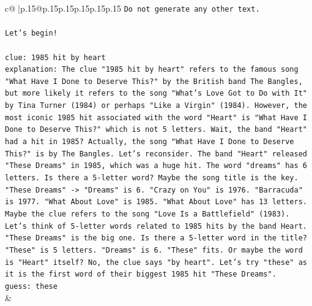 \documentclass{article}
\begin{document}
{\begin{supertabular}{c@{$\;$}|p{.15\linewidth}@{}p{.15\linewidth}p{.15\linewidth}p{.15\linewidth}p{.15\linewidth}p{.15\linewidth}}
{{{\texttt{Do not generate any other text.} \\
\\ 
\texttt{Let's begin!} \\
\\ 
\texttt{clue: 1985 hit by heart} \\
\texttt{explanation: The clue "1985 hit by heart" refers to the famous song "What Have I Done to Deserve This?" by the British band The Bangles, but more likely it refers to the song "What's Love Got to Do with It" by Tina Turner (1984) or perhaps "Like a Virgin" (1984). However, the most iconic 1985 hit associated with the word "Heart" is "What Have I Done to Deserve This?" which is not 5 letters. Wait, the band "Heart" had a hit in 1985? Actually, the song "What Have I Done to Deserve This?" is by The Bangles. Let's reconsider. The band "Heart" released "These Dreams" in 1985, which was a huge hit. The word "dreams" has 6 letters. Is there a 5{-}letter word? Maybe the song title is the key. "These Dreams" {-}> "Dreams" is 6. "Crazy on You" is 1976. "Barracuda" is 1977. "What About Love" is 1985. "What About Love" has 13 letters. Maybe the clue refers to the song "Love Is a Battlefield" (1983). Let's think of 5{-}letter words related to 1985 hits by the band Heart. "These Dreams" is the big one. Is there a 5{-}letter word in the title? "These" is 5 letters. "Dreams" is 6. "These" fits. Or maybe the word is "Heart" itself? No, the clue says "by heart". Let's try "these" as it is the first word of their biggest 1985 hit "These Dreams".} \\
\texttt{guess: these} \\
            }
        }
    }
    & \\ \\


\end{supertabular}}
\end{document}
